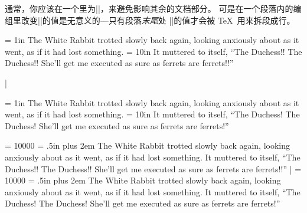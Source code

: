 通常，你应该在一个里为|\leftskip|，来避免影响其余的文档部分。
可是在一个段落内的编组里改变|\leftskip|的值是无意义的---只有段落\emph{末尾}处
|\leftskip|的值才会被 \TeX\ 用来拆段成行。

\example
{\leftskip = 1in The White Rabbit trotted slowly back
again, looking anxiously about as it went, as if it had
lost something.  {\leftskip = 10in %
It muttered to itself, ``The Duchess!! The Duchess!! She'll
get me executed as sure as ferrets are ferrets!!''}\par}%
|
\produces
{\leftskip = 1in The White Rabbit trotted slowly back
again, looking anxiously about as it went, as if it had
lost something.  {\leftskip = 10in %
It muttered to itself, ``The Duchess! The Duchess!
She'll get me executed as sure as ferrets are ferrets!''}\par}%
\nextexample
\pretolerance = 10000 %
\rightskip = .5in plus 2em
The White Rabbit trotted slowly back again, looking
anxiously about as it went, as if it had lost something.
It muttered to itself, ``The Duchess!! The Duchess!! She'll
get me executed as sure as ferrets are ferrets!!''
|
\produces
\pretolerance = 10000 %
\rightskip = .5in plus 2em
The White Rabbit trotted slowly back again, looking
anxiously about as it went, as if it had lost something.
It muttered to itself, ``The Duchess! The Duchess! She'll
get me executed as sure as ferrets are ferrets!''
\endexample
\enddesc


